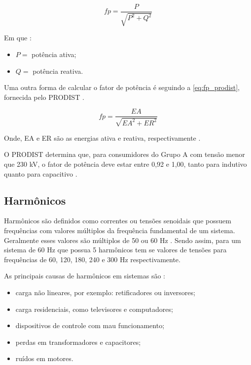\begin{equation}
  fp = \frac{P}{\sqrt{P^2 + Q^2}}
  \label{eq:fp_glover}
\end{equation}

Em que \cite{ref:glover_2017}:

\begin{itemize}
  \item $P =$ potência ativa;
  \item $Q =$ potência reativa.
\end{itemize}

Uma outra forma de calcular o fator de potência é seguindo a \autoref{eq:fp_prodist}, fornecida pelo PRODIST \cite{ref:ANEEL2021}.

\begin{equation}
  fp = \frac{EA}{\sqrt{EA^2 + ER^2}}
  \label{eq:fp_prodist}
\end{equation}

Onde, EA e ER são as energias ativa e reativa, respectivamente \cite{ref:ANEEL2021}.

O PRODIST determina que, para consumidores do Grupo A com tensão menor que 230 kV, o fator de potência deve estar entre 0,92 e 1,00, tanto para indutivo quanto para capacitivo \cite{ref:ANEEL2021}.

\subsection{Harmônicos}

Harmônicos são definidos como correntes ou tensões senoidais que possuem frequências com valores múltiplos da frequência fundamental de um sistema. Geralmente esses valores são múltiplos de 50 ou 60 Hz \cite{ref:fuchs_2015}. Sendo assim, para um sistema de 60 Hz que possua 5 harmônicos tem se valores de tensões para frequências de 60, 120, 180, 240 e 300 Hz respectivamente.

As principais causas de harmônicos em sistemas são \cite{ref:fuchs_2015}:

\begin{itemize}
  \item carga não lineares, por exemplo: retificadores ou inversores;
  \item carga residenciais, como televisores e computadores;
  \item dispositivos de controle com mau funcionamento;
  \item perdas em transformadores e capacitores;
  \item ruídos em motores.
\end{itemize}

